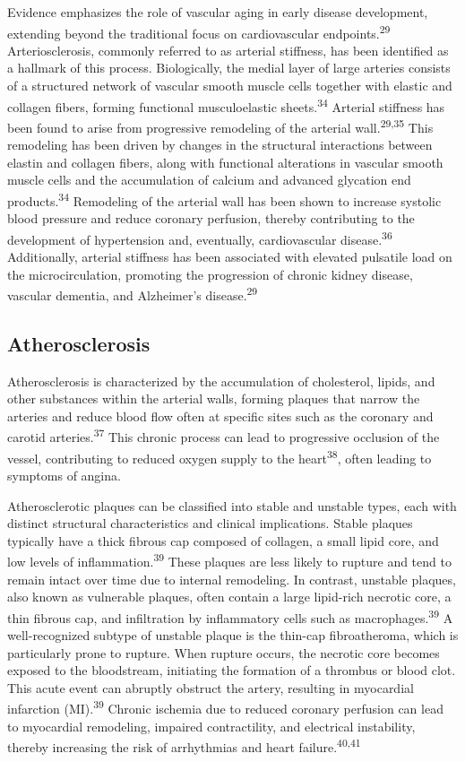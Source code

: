 \documentclass[
  a4paper,
  headsepline=true,
  open=left]{scrbook}
\begin{document}
Evidence emphasizes the role of vascular aging in early disease
development, extending beyond the traditional focus on cardiovascular
endpoints.\textsuperscript{29} Arteriosclerosis, commonly referred to as
arterial stiffness, has been identified as a hallmark of this process.
Biologically, the medial layer of large arteries consists of a
structured network of vascular smooth muscle cells together with elastic
and collagen fibers, forming functional musculoelastic
sheets.\textsuperscript{34} Arterial stiffness has been found to arise
from progressive remodeling of the arterial wall.\textsuperscript{29,35}
This remodeling has been driven by changes in the structural
interactions between elastin and collagen fibers, along with functional
alterations in vascular smooth muscle cells and the accumulation of
calcium and advanced glycation end products.\textsuperscript{34}
Remodeling of the arterial wall has been shown to increase systolic
blood pressure and reduce coronary perfusion, thereby contributing to
the development of hypertension and, eventually, cardiovascular
disease.\textsuperscript{36} Additionally, arterial stiffness has been
associated with elevated pulsatile load on the microcirculation,
promoting the progression of chronic kidney disease, vascular dementia,
and Alzheimer's disease.\textsuperscript{29}

\hypertarget{atherosclerosis}{%
\subsection{Atherosclerosis}\label{atherosclerosis}}

Atherosclerosis is characterized by the accumulation of cholesterol,
lipids, and other substances within the arterial walls, forming plaques
that narrow the arteries and reduce blood flow often at specific sites
such as the coronary and carotid arteries.\textsuperscript{37} This
chronic process can lead to progressive occlusion of the vessel,
contributing to reduced oxygen supply to the heart\textsuperscript{38},
often leading to symptoms of angina.

Atherosclerotic plaques can be classified into stable and unstable
types, each with distinct structural characteristics and clinical
implications. Stable plaques typically have a thick fibrous cap composed
of collagen, a small lipid core, and low levels of
inflammation.\textsuperscript{39} These plaques are less likely to
rupture and tend to remain intact over time due to internal remodeling.
In contrast, unstable plaques, also known as vulnerable plaques, often
contain a large lipid-rich necrotic core, a thin fibrous cap, and
infiltration by inflammatory cells such as
macrophages.\textsuperscript{39} A well-recognized subtype of unstable
plaque is the thin-cap fibroatheroma, which is particularly prone to
rupture. When rupture occurs, the necrotic core becomes exposed to the
bloodstream, initiating the formation of a thrombus or blood clot. This
acute event can abruptly obstruct the artery, resulting in myocardial
infarction (MI).\textsuperscript{39} Chronic ischemia due to reduced
coronary perfusion can lead to myocardial remodeling, impaired
contractility, and electrical instability, thereby increasing the risk
of arrhythmias and heart failure.\textsuperscript{40,41}
\end{document}
